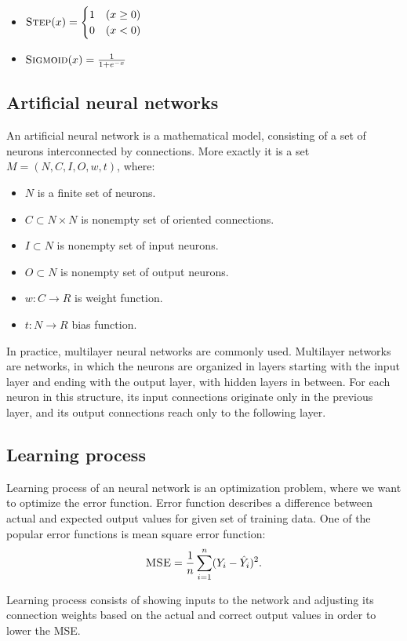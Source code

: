 \begin{itemize}
\item $\textsc{Step}(x)=\begin{cases} 1 & (x \geq 0) \\ 0 & (x < 0) \end{cases}$
\item $\textsc{Sigmoid}(x) = \frac{1}{1+e^{-x}} $
\end{itemize}

\subsection{Artificial neural networks}
An artificial neural network is a mathematical model, consisting of a set of neurons interconnected by connections.
More exactly it is a set 
$M  =  (N,C,I,O,w,t)$,  where:
\begin{itemize}
\item $N$  is  a  finite  set  of  neurons.
\item $C \subset N \times N$  is  nonempty  set  of  oriented  connections.
\item $I \subset N$  is  nonempty  set  of  input  neurons.
\item $O \subset N$  is  nonempty  set  of  output  neurons.
\item $w : C \to R$  is  weight  function.
\item $t : N\to R$  bias  function.
\end{itemize}

In practice, multilayer neural networks are commonly used. Multilayer networks are networks, in which the neurons are organized in layers starting with the input layer and ending with the output layer, with hidden layers in between. For each neuron in this structure, its input connections originate only in the previous layer, and its output connections reach only to the following layer.

\subsection{Learning process}
Learning process of an neural network is an optimization problem, where we want to optimize the error function. Error function describes a difference between actual and expected output values for given set of training data. One of the popular error functions is mean square error function:
\[
\textsc{MSE} = \frac{1}{n} \sum_{i=1}^{n} (Y_{i} - \hat{Y}_{i})^2.
\]

Learning process consists of showing inputs to the network and adjusting its connection weights based on the actual and correct output values in order to lower the \textsc{MSE}.

